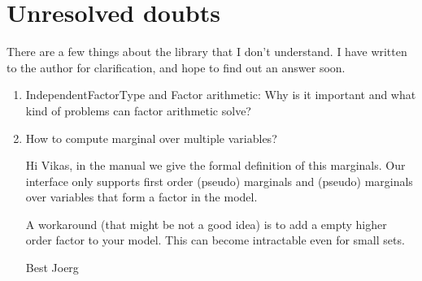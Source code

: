 \documentclass[12pt,oneside,letterpaper]{article}
\begin{document}
\section{Unresolved doubts}
There are a few things about the library that I don't understand. I have
written to the author for clarification, and hope to find out an answer soon.

\begin{enumerate}
  \item IndependentFactorType and Factor arithmetic: Why is it important and what kind of problems can factor arithmetic solve?
  \item How to compute marginal over multiple variables?

    Hi Vikas,
    in the manual we give the formal definition of this marginals.
    Our interface only supports first order (pseudo) marginals and (pseudo) marginals over variables that form a factor in the model.

    A workaround (that might be not a good idea) is to add a empty higher order factor to your model. This can become intractable even for small sets.

    Best Joerg
\end{enumerate}
\end{document}
